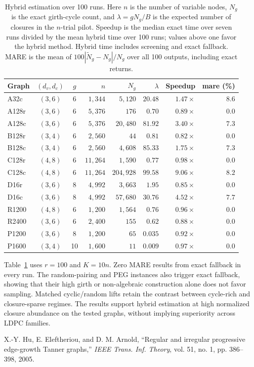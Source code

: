 \begin{table}[!ht]
\centering
\caption{Hybrid estimation over 100 runs.
Here $n$ is the number of variable nodes, $N_g$ is the exact girth-cycle
count, and $\lambda=gN_g/B$ is the expected number of closures in the
$n$-trial pilot.
Speedup is the median exact time over seven runs divided by the mean
hybrid time over 100 runs; values above one favor the hybrid method.
Hybrid time includes screening and exact fallback.
MARE is the mean of $100|\widetilde N_g-N_g|/N_g$ over all 100 outputs,
including exact returns.}
\label{tab:hybrid-exp}
\footnotesize
\setlength{\tabcolsep}{3.6pt}
\begin{tabular}{lccrrrrr}
\hline
Graph & $(d_v,d_c)$ & $g$ & $n$ & $N_g$ & $\lambda$
& Speedup & mare (\%)\\
\hline
A32c & $(3,6)$ & 6 & $1,344$ & $5,120$ & $20.48$ & $1.47\times$ & $8.6$\\
A128r & $(3,6)$ & 6 & $5,376$ & $176$ & $0.70$ & $0.89\times$ & $0.0$\\
A128c & $(3,6)$ & 6 & $5,376$ & $20,480$ & $81.92$ & $3.40\times$ & $7.3$\\
B128r & $(3,4)$ & 6 & $2,560$ & $44$ & $0.81$ & $0.82\times$ & $0.0$\\
B128c & $(3,4)$ & 6 & $2,560$ & $4,608$ & $85.33$ & $1.75\times$ & $7.3$\\
C128r & $(4,8)$ & 6 & $11,264$ & $1,590$ & $0.77$ & $0.98\times$ & $0.0$\\
C128c & $(4,8)$ & 6 & $11,264$ & $204,928$ & $99.58$ & $9.06\times$ & $8.2$\\
D16r & $(3,6)$ & 8 & $4,992$ & $3,663$ & $1.95$ & $0.85\times$ & $0.0$\\
D16c & $(3,6)$ & 8 & $4,992$ & $57,680$ & $30.76$ & $4.52\times$ & $7.7$\\
R1200 & $(4,8)$ & 6 & $1,200$ & $1,564$ & $0.76$ & $0.96\times$ & $0.0$\\
R2400 & $(3,6)$ & 6 & $2,400$ & $155$ & $0.62$ & $0.88\times$ & $0.0$\\
P1200 & $(3,6)$ & 8 & $1,200$ & $65$ & $0.035$ & $0.92\times$ & $0.0$\\
P1600 & $(3,4)$ & 10 & $1,600$ & $11$ & $0.009$ & $0.97\times$ & $0.0$\\
\hline
\end{tabular}
\end{table}

Table~\ref{tab:hybrid-exp} uses $r=100$ and $K=10n$.
Zero MARE results from exact fallback in every run.
The random-pairing and PEG instances also trigger exact fallback,
showing that their high girth or non-algebraic construction alone does
not favor sampling. Matched cyclic/random lifts retain the contrast
between cycle-rich and closure-sparse regimes. The results support
hybrid estimation at high normalized closure abundance on the tested
graphs, without implying superiority across LDPC families.

X.-Y. Hu, E. Eleftheriou, and D. M. Arnold,
``Regular and irregular progressive edge-growth Tanner graphs,''
\emph{IEEE Trans. Inf. Theory}, vol. 51, no. 1, pp. 386--398, 2005.
